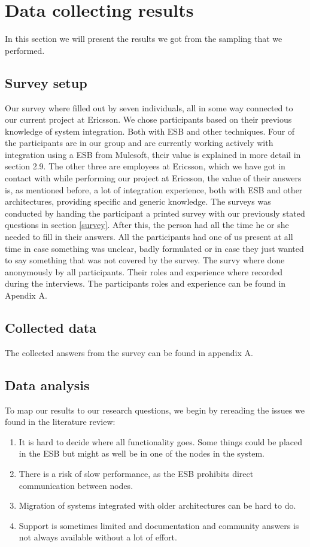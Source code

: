 \documentclass{llncs}
\begin{document}
\section{Data collecting results}
In this section we will present the results we got from the sampling that we performed.
\subsection{Survey setup}

Our survey where filled out by seven individuals, all in some way connected to our current project at Ericsson. We chose participants based on their previous knowledge of system integration. Both with ESB and other techniques. Four of the participants are in our group and are currently working actively with integration using a ESB from Mulesoft, their value is explained in more detail in section 2.9. The other three are employees at Ericsson, which we have got in contact with while performing our project at Ericsson, the value of their answers is, as mentioned before, a lot of integration experience, both with ESB and other architectures, providing specific and generic knowledge.
The surveys was conducted by handing the participant a printed survey with our previously stated questions  in section \ref{survey}. After this, the person had all the time he or she needed to fill in their answers.
All the participants had one of us present at all time in case something was unclear, badly formulated or in case they just wanted to say something that was not covered by the survey. The survy where done anonymously by all participants. Their roles and experience where recorded during the interviews. The participants roles and experience can be found in Apendix A.

\subsection{Collected data}
The collected answers from the survey can be found in appendix A.

\subsection{Data analysis}

To map our results to our research questions, we begin by rereading the issues we found in the literature review:

\begin{enumerate}
\item It is hard to decide where all functionality goes. Some things could be placed in the ESB but might as well be in one of the nodes in the system.
\item There is a risk of slow performance, as the ESB prohibits direct communication between nodes.
\item Migration of systems integrated with older architectures can be hard to do.
\item Support is sometimes limited and documentation and community answers is not always available without a lot of effort.
\end{enumerate}
\end{document}
